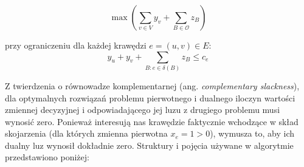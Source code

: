 \documentclass{article}
\theoremstyle{definition}
\theoremstyle{plain}
\theoremstyle{remark}
\begin{document}
\begin{equation}
    \max \left( \sum_{v \in V} y_v + \sum_{B \in \mathcal{O}} z_B \right)
\end{equation}

\noindent
przy ograniczeniu dla każdej krawędzi $e = (u, v) \in E$:
\begin{equation} \label{eq:dual:edgeContraint}
    y_u + y_v + \sum_{B: e \in \delta(B)} z_B \le c_e
\end{equation}

Z twierdzenia o równowadze komplementarnej (ang. \textit{complementary slackness}), dla optymalnych rozwiązań problemu pierwotnego i dualnego iloczyn wartości zmiennej decyzyjnej i odpowiadającego jej luzu z drugiego problemu musi wynosić zero. Ponieważ interesują nas krawędzie faktycznie wchodzące w skład skojarzenia (dla których zmienna pierwotna $x_e = 1 > 0$), wymusza to, aby ich dualny luz wynosił dokładnie zero. Struktury i pojęcia używane w algorytmie przedstawiono poniżej:
\end{document}
